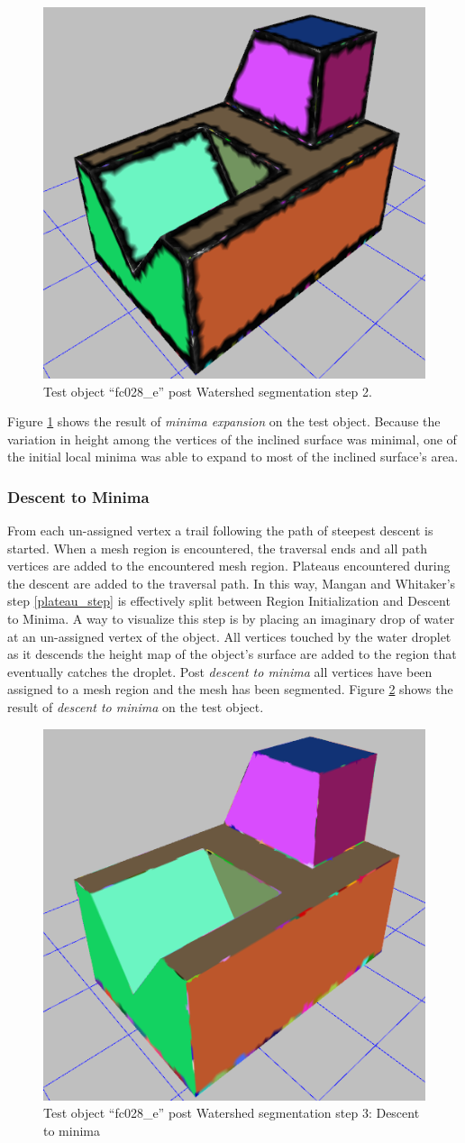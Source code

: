 \begin{figure}[htb]
	\centering
	\includegraphics[width=0.5\linewidth]{../resources/watershed/fc028_WS2.png}
\caption{
Test object ``fc028\_e'' post Watershed segmentation step 2.
}
	\label{fig:ws_2}
\end{figure}

Figure \ref{fig:ws_2} shows the result of \textit{minima expansion} on the test object.
Because the variation in height among the vertices of the inclined surface was minimal, one of the initial local minima was able to expand to most of the inclined surface's area.

\subsubsection{Descent to Minima}
From each un-assigned vertex a trail following the path of steepest descent is started.
When a mesh region is encountered, the traversal ends and all path vertices are added to the encountered mesh region.
Plateaus encountered during the descent are added to the traversal path.
In this way, Mangan and Whitaker's step \ref{plateau_step} is effectively split between Region Initialization and Descent to Minima.
A way to visualize this step is by placing an imaginary drop of water at an un-assigned vertex of the object.
All vertices touched by the water droplet as it descends the height map of the object's surface are added to the region that eventually catches the droplet.
Post \textit{descent to minima} all vertices have been assigned to a mesh region and the mesh has been segmented.
Figure \ref{fig:ws_3} shows the result of \textit{descent to minima} on the test object.

\begin{figure}[htb]
	\centering
	\includegraphics[width=0.5\linewidth]{../resources/watershed/fc028_WS3.png}
\caption{
Test object ``fc028\_e'' post Watershed segmentation step 3: Descent to minima
}
	\label{fig:ws_3}
\end{figure}

